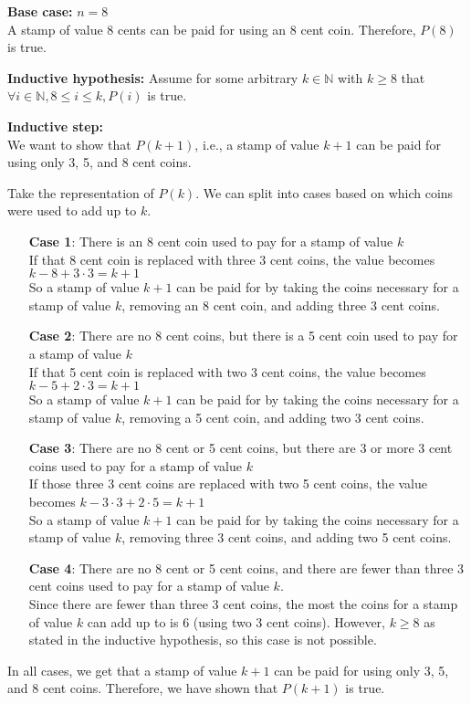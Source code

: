 \documentclass[12pt, leqno]{article}
\newcommand{\N}{\mathbb N}
\begin{document}
\textbf{Base case:} $n = 8$\\
A stamp of value 8 cents can be paid for using an 8 cent coin. Therefore, $P(8)$ is true.

\textbf{Inductive hypothesis:} Assume for some arbitrary $k \in \N$ with $k \geq 8$ that $\forall i \in \N, 8 \leq i \leq k, P(i)$ is true.

\textbf{Inductive step:}\\
We want to show that $P(k+1)$, i.e., a stamp of value $k + 1$ can be paid for using only 3, 5, and 8 cent coins.

Take the representation of $P(k)$. We can split into cases based on which coins were used to add up to $k$.

\begin{itemize}
    \item[\textbf{Case 1}:] There is an 8 cent coin used to pay for a stamp of value $k$\\
    If that 8 cent coin is replaced with three 3 cent coins, the value becomes $k - 8 + 3 \cdot 3 = k + 1$\\
    So a stamp of value $k+1$ can be paid for by taking the coins necessary for a stamp of value $k$, removing an 8 cent coin, and adding three 3 cent coins.
    \item[\textbf{Case 2}:] There are no 8 cent coins, but there is a 5 cent coin used to pay for a stamp of value $k$\\
    If that 5 cent coin is replaced with two 3 cent coins, the value becomes $k - 5 + 2 \cdot 3 = k + 1$\\
    So a stamp of value $k+1$ can be paid for by taking the coins necessary for a stamp of value $k$, removing a 5 cent coin, and adding two 3 cent coins.
    \item[\textbf{Case 3}:] There are no 8 cent or 5 cent coins, but there are 3 or more 3 cent coins used to pay for a stamp of value $k$\\
    If those three 3 cent coins are replaced with two 5 cent coins, the value becomes $k - 3 \cdot 3 + 2 \cdot 5 = k + 1$\\
    So a stamp of value $k+1$ can be paid for by taking the coins necessary for a stamp of value $k$, removing three 3 cent coins, and adding two 5 cent coins.
    \item[\textbf{Case 4}:] There are no 8 cent or 5 cent coins, and there are fewer than three 3 cent coins used to pay for a stamp of value $k$.\\
    Since there are fewer than three 3 cent coins, the most the coins for a stamp of value $k$ can add up to is 6 (using two 3 cent coins). However, $k \geq 8$ as stated in the inductive hypothesis, so this case is not possible.
\end{itemize}
In all cases, we get that a stamp of value $k+1$ can be paid for using only 3, 5, and 8 cent coins. Therefore, we have shown that $P(k+1)$ is true.
\end{document}
